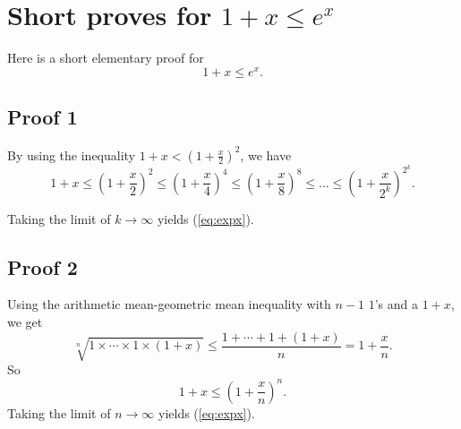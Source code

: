 \documentclass{article}
\begin{document}
\section{Short proves for $1 + x \le e^x$}


Here is a short elementary proof for
\begin{equation}
1 + x \le e^x.
\label{eq:expx}
\end{equation}


\subsection{Proof 1}

By using the inequality $1 + x < \left(1 + \frac{x}{2}\right)^2$, we have
\begin{equation}
1 + x
\le
\left(1 + \frac x 2 \right)^2
\le
\left(1 + \frac x 4 \right)^4
\le
\left(1 + \frac x 8 \right)^8
\le
\dots
\le
\left(1 + \frac x {2^k} \right)^{2^k}.
\end{equation}

Taking the limit of $k \rightarrow \infty$ yields (\ref{eq:expx}).



\subsection{Proof 2}

Using the arithmetic mean-geometric mean inequality
with $n - 1$ $1$'s and a $1+x$, we get
\begin{equation}
  \sqrt[n]{1 \times \cdots \times 1 \times (1 + x)}
  \le
  \frac{1 + \cdots + 1 + (1 + x) } { n }
  =1 + \frac{x}{n}.
\end{equation}
So
$$
1 + x \le \left( 1 + \frac{x}{n} \right)^n.
$$
Taking the limit of $n \rightarrow \infty$ yields (\ref{eq:expx}).
\end{document}

